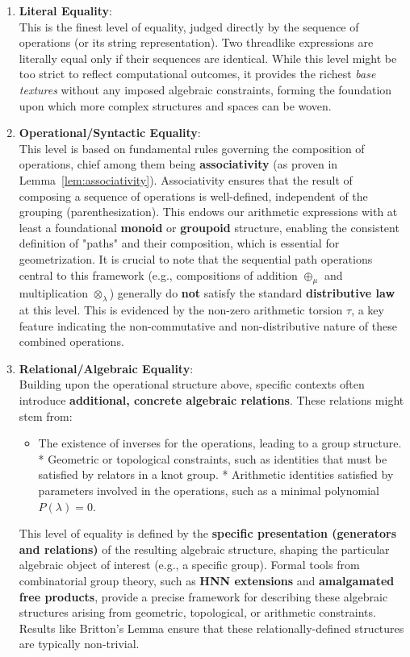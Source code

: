 \begin{enumerate}
    \item \textbf{Literal Equality}: \\
    This is the finest level of equality, judged directly by the sequence of operations (or its string representation). Two threadlike expressions are literally equal only if their sequences are identical. While this level might be too strict to reflect computational outcomes, it provides the richest \emph{base textures} without any imposed algebraic constraints, forming the foundation upon which more complex structures and spaces can be woven.

    \item \textbf{Operational/Syntactic Equality}: \\
    This level is based on fundamental rules governing the composition of operations, chief among them being \textbf{associativity} (as proven in Lemma~\ref{lem:associativity}). Associativity ensures that the result of composing a sequence of operations is well-defined, independent of the grouping (parenthesization). This endows our arithmetic expressions with at least a foundational \textbf{monoid} or \textbf{groupoid} structure, enabling the consistent definition of "paths" and their composition, which is essential for geometrization. It is crucial to note that the sequential path operations central to this framework (e.g., compositions of addition $\oplus_\mu$ and multiplication $\otimes_\lambda$) generally do \textbf{not} satisfy the standard \textbf{distributive law} at this level. This is evidenced by the non-zero arithmetic torsion $\tau$, a key feature indicating the non-commutative and non-distributive nature of these combined operations.

    \item \textbf{Relational/Algebraic Equality}: \\
    Building upon the operational structure above, specific contexts often introduce \textbf{additional, concrete algebraic relations}. These relations might stem from:
    \begin{itemize}
        \item The existence of inverses for the operations, leading to a group structure.
        * Geometric or topological constraints, such as identities that must be satisfied by relators in a knot group.
        * Arithmetic identities satisfied by parameters involved in the operations, such as a minimal polynomial $P(\lambda)=0$.
    \end{itemize}
    This level of equality is defined by the \textbf{specific presentation (generators and relations)} of the resulting algebraic structure, shaping the particular algebraic object of interest (e.g., a specific group). Formal tools from combinatorial group theory, such as \textbf{HNN extensions} and \textbf{amalgamated free products}, provide a precise framework for describing these algebraic structures arising from geometric, topological, or arithmetic constraints. Results like Britton's Lemma ensure that these relationally-defined structures are typically non-trivial.


\end{enumerate}
